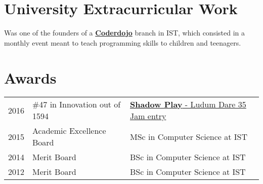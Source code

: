 \documentclass[a4paper]{deedy-resume} %
\begin{document}
\begin{minipage}[t]{0.64\textwidth}
\begin{comment}
\sectionspace %
\end{comment}


\section{University Extracurricular Work}


Was one of the founders of a \textbf{\href{https://coderdojo.com/}{Coderdojo}} branch in IST, which consisted in a monthly event meant to teach programming skills to children and teenagers.

\sectionspace %



\section{Awards} 
\begin{tabular}{rll}
	2016	     & \#47 in Innovation out of 1594 & \href{http://ludumdare.com/compo/ludum-dare-35/?uid=90138}{\textbf{Shadow Play} - Ludum Dare 35 Jam entry}\\
    2015	     & Academic Excellence Board  & MSc in Computer Science at IST\\
	2014	     & Merit Board  & BSc in Computer Science at IST\\
	2012	     & Merit Board  & BSc in Computer Science at IST\\
\end{tabular}


\end{minipage} %


\end{document}
